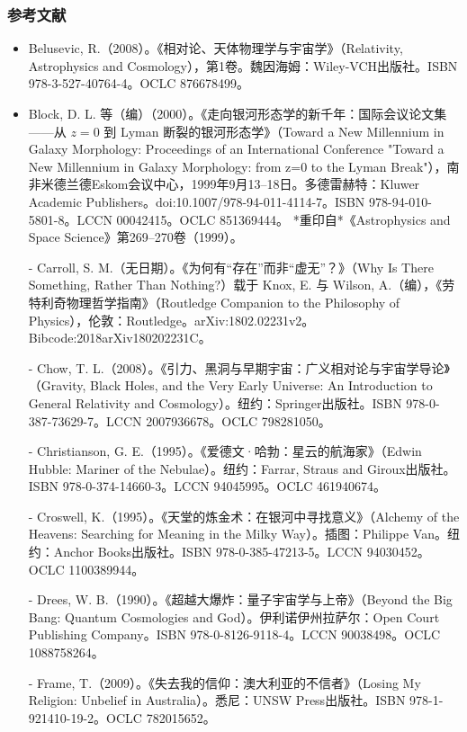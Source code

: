 \subsubsection{参考文献}
\begin{itemize}
\item Belusevic, R.（2008）。《相对论、天体物理学与宇宙学》（Relativity, Astrophysics and Cosmology），第1卷。魏因海姆：Wiley-VCH出版社。ISBN 978-3-527-40764-4。OCLC 876678499。  
\item Block, D. L. 等（编）（2000）。《走向银河形态学的新千年：国际会议论文集——从 $z=0$ 到 Lyman 断裂的银河形态学》（Toward a New Millennium in Galaxy Morphology: Proceedings of an International Conference "Toward a New Millennium in Galaxy Morphology: from z=0 to the Lyman Break"），南非米德兰德Eskom会议中心，1999年9月13–18日。多德雷赫特：Kluwer Academic Publishers。doi:10.1007/978-94-011-4114-7。ISBN 978-94-010-5801-8。LCCN 00042415。OCLC 851369444。  
  *重印自*《Astrophysics and Space Science》第269–270卷（1999）。  

- Carroll, S. M.（无日期）。《为何有“存在”而非“虚无”？》（Why Is There Something, Rather Than Nothing?）载于 Knox, E. 与 Wilson, A.（编），《劳特利奇物理哲学指南》（Routledge Companion to the Philosophy of Physics），伦敦：Routledge。arXiv:1802.02231v2。Bibcode:2018arXiv180202231C。  

- Chow, T. L.（2008）。《引力、黑洞与早期宇宙：广义相对论与宇宙学导论》（Gravity, Black Holes, and the Very Early Universe: An Introduction to General Relativity and Cosmology）。纽约：Springer出版社。ISBN 978-0-387-73629-7。LCCN 2007936678。OCLC 798281050。  

- Christianson, G. E.（1995）。《爱德文·哈勃：星云的航海家》（Edwin Hubble: Mariner of the Nebulae）。纽约：Farrar, Straus and Giroux出版社。ISBN 978-0-374-14660-3。LCCN 94045995。OCLC 461940674。  

- Croswell, K.（1995）。《天堂的炼金术：在银河中寻找意义》（Alchemy of the Heavens: Searching for Meaning in the Milky Way）。插图：Philippe Van。纽约：Anchor Books出版社。ISBN 978-0-385-47213-5。LCCN 94030452。OCLC 1100389944。  

- Drees, W. B.（1990）。《超越大爆炸：量子宇宙学与上帝》（Beyond the Big Bang: Quantum Cosmologies and God）。伊利诺伊州拉萨尔：Open Court Publishing Company。ISBN 978-0-8126-9118-4。LCCN 90038498。OCLC 1088758264。  

- Frame, T.（2009）。《失去我的信仰：澳大利亚的不信者》（Losing My Religion: Unbelief in Australia）。悉尼：UNSW Press出版社。ISBN 978-1-921410-19-2。OCLC 782015652。  


\end{itemize}
